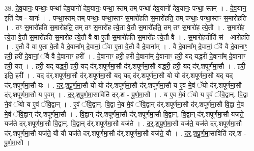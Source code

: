 \documentclass[17pt]{extarticle}
\begin{document}
38. दे॒व॒यानः॒ पन्थाः॒ पन्था॑ देव॒यानो॑ देव॒यानः॒ पन्था॒ स्तम् तम् पन्था॑ देव॒यानो॑ देव॒यानः॒ पन्था॒ स्तम् । . दे॒व॒यान॒ इति॑ देव - यानः॑ । . पन्था॒स्तम् तम् पन्थाः॒ पन्था॒स्तꣳ स॒मारो॑हति स॒मारो॑हति॒ तम् पन्थाः॒ पन्था॒स्तꣳ स॒मारो॑हति । . तꣳ स॒मारो॑हति स॒मारो॑हति॒ तम् तꣳ स॒मारो॑ह त्ये॒ता वे॒तौ स॒मारो॑हति॒ तम् तꣳ स॒मारो॑ह त्ये॒तौ । . स॒मारो॑ह त्ये॒ता वे॒तौ स॒मारो॑हति स॒मारो॑ह त्ये॒तौ वै वा ए॒तौ स॒मारो॑हति स॒मारो॑ह त्ये॒तौ वै । . स॒मारो॑ह॒तीति॑ सं - आरो॑हति । . ए॒तौ वै वा ए॒ता वे॒तौ वै दे॒वाना᳚म् दे॒वानां॒ ॅवा ए॒ता वे॒तौ वै दे॒वाना᳚म् । . वै दे॒वाना᳚म् दे॒वानां॒ ॅवै वै दे॒वानाꣳ॒॒ हरी॒ हरी॑ दे॒वानां॒ ॅवै वै दे॒वानाꣳ॒॒ हरी᳚ । . दे॒वानाꣳ॒॒ हरी॒ हरी॑ दे॒वाना᳚म् दे॒वानाꣳ॒॒ हरी॒ यद् यद्धरी॑ दे॒वाना᳚म् दे॒वानाꣳ॒॒ हरी॒ यत् । . हरी॒ यद् यद्धरी॒ हरी॒ यद् द॑र्.शपूर्णमा॒सौ द॑र्.शपूर्णमा॒सौ यद्धरी॒ हरी॒ यद् द॑र्.शपूर्णमा॒सौ । . हरी॒ इति॒ हरी᳚ । . यद् द॑र्.शपूर्णमा॒सौ द॑र्.शपूर्णमा॒सौ यद् यद् द॑र्.शपूर्णमा॒सौ यो यो द॑र्.शपूर्णमा॒सौ यद् यद् द॑र्.शपूर्णमा॒सौ यः । . द॒र्॒.श॒पू॒र्ण॒मा॒सौ यो यो द॑र्.शपूर्णमा॒सौ द॑र्.शपूर्णमा॒सौ य ए॒व मे॒वं ॅयो द॑र्.शपूर्णमा॒सौ द॑र्.शपूर्णमा॒सौ य ए॒वम् । . द॒र्॒.श॒पू॒र्ण॒मा॒साविति॑ दर्.श - पू॒र्ण॒मा॒सौ । . य ए॒व मे॒वं ॅयो य ए॒वं ॅवि॒द्वान्. वि॒द्वा ने॒वं ॅयो य ए॒वं ॅवि॒द्वान् । . ए॒वं ॅवि॒द्वान्. वि॒द्वा ने॒व मे॒वं ॅवि॒द्वान् द॑र्.शपूर्णमा॒सौ द॑र्.शपूर्णमा॒सौ वि॒द्वा ने॒व मे॒वं ॅवि॒द्वान् द॑र्.शपूर्णमा॒सौ । . वि॒द्वान् द॑र्.शपूर्णमा॒सौ द॑र्.शपूर्णमा॒सौ वि॒द्वान्. वि॒द्वान् द॑र्.शपूर्णमा॒सौ यज॑ते॒ यज॑ते दर्.शपूर्णमा॒सौ वि॒द्वान्. वि॒द्वान् द॑र्.शपूर्णमा॒सौ यज॑ते । . द॒र्॒.श॒पू॒र्ण॒मा॒सौ यज॑ते॒ यज॑ते दर्.शपूर्णमा॒सौ द॑र्.शपूर्णमा॒सौ यज॑ते॒ यौ यौ यज॑ते दर्.शपूर्णमा॒सौ द॑र्.शपूर्णमा॒सौ यज॑ते॒ यौ । . द॒र्॒.श॒पू॒र्ण॒मा॒साविति॑ दर्.श - पू॒र्ण॒मा॒सौ । \newline
\end{document}
